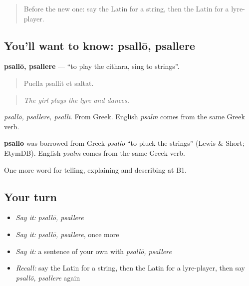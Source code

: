 \label{lesson:LA-C544-psallo}



\begin{quote}
Before the new one: say the Latin for a string, then the Latin for a lyre-player.
\end{quote}

\subsection*{You'll want to know: psallō, psallere}
\textbf{psallō, psallere} — \textquotedblleft{}to play the cithara, sing to strings\textquotedblright{}.

\begin{quote}
Puella psallit et saltat.
\end{quote}

\begin{quote}
\emph{The girl plays the lyre and dances.}
\end{quote}

\emph{psallō, psallere, psallī}. From Greek. English \emph{psalm} comes from the same Greek verb.

\begin{cousinweb}
\textbf{psallō} was borrowed from Greek \emph{psallo} \textquotedblleft{}to pluck the strings\textquotedblright{} (Lewis \& Short; EtymDB). English \emph{psalm} comes from the same Greek verb.
\end{cousinweb}

\begin{grammarlens}[title={What you've built}]
One more word for telling, explaining and describing at B1.
\end{grammarlens}

\subsection*{Your turn}
\begin{itemize}
\raggedright
  \item \emph{Say it:} \emph{psallō, psallere}
  \item \emph{Say it:} \emph{psallō, psallere}, once more
  \item \emph{Say it:} a sentence of your own with \emph{psallō, psallere}
  \item \emph{Recall:} say the Latin for a string, then the Latin for a lyre-player, then say \emph{psallō, psallere} again
\end{itemize}

